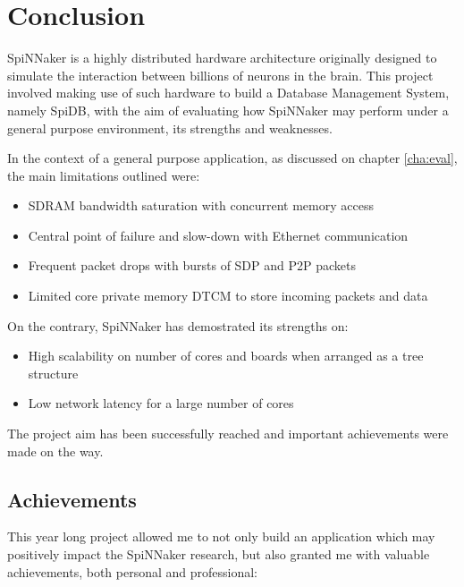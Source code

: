 \chapter{Conclusion}
\label{cha:conclusion}
SpiNNaker is a highly distributed hardware architecture originally designed to simulate the interaction between billions of neurons in the brain. This project involved making use of such hardware to build a Database Management System, namely SpiDB, with the aim of evaluating how SpiNNaker may perform under a general purpose environment, its strengths and weaknesses.

In the context of a general purpose application, as discussed on chapter \ref{cha:eval}, the main limitations outlined were:
\begin{itemize}
\setlength\itemsep{-0.3em}
	\item SDRAM bandwidth saturation with concurrent memory access
	\item Central point of failure and slow-down with Ethernet communication
	\item Frequent packet drops with bursts of SDP and P2P packets
	\item Limited core private memory DTCM to store incoming packets and data
\end{itemize}

On the contrary, SpiNNaker has demostrated its strengths on:
\begin{itemize}
\setlength\itemsep{-0.3em}
	\item High scalability on number of cores and boards when arranged as a tree structure
	\item Low network latency for a large number of cores
\end{itemize}

The project aim has been successfully reached and important achievements were made on the way.

\section{Achievements}
This year long project allowed me to not only build an application which may positively impact the SpiNNaker research, but also granted me with valuable achievements, both personal and professional:

